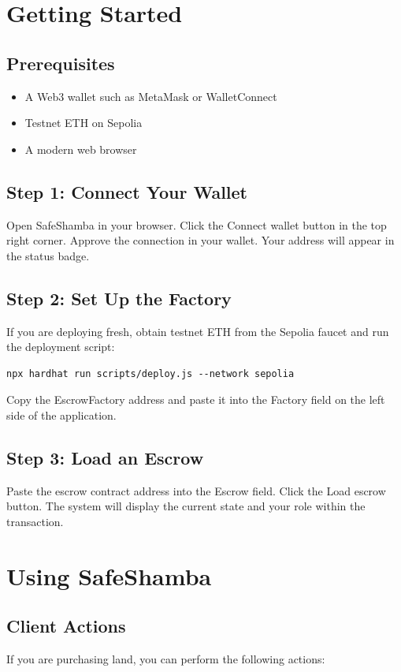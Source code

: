 \documentclass[11pt]{article}
\begin{document}
\section{Getting Started}
\subsection{Prerequisites}
\begin{itemize}
\item A Web3 wallet such as MetaMask or WalletConnect
\item Testnet ETH on Sepolia
\item A modern web browser
\end{itemize}

\subsection{Step 1: Connect Your Wallet}
Open SafeShamba in your browser. Click the Connect wallet button in the top right corner. Approve the connection in your wallet. Your address will appear in the status badge.

\subsection{Step 2: Set Up the Factory}
If you are deploying fresh, obtain testnet ETH from the Sepolia faucet and run the deployment script:
\begin{verbatim}
npx hardhat run scripts/deploy.js --network sepolia
\end{verbatim}
Copy the EscrowFactory address and paste it into the Factory field on the left side of the application.

\subsection{Step 3: Load an Escrow}
Paste the escrow contract address into the Escrow field. Click the Load escrow button. The system will display the current state and your role within the transaction.

\section{Using SafeShamba}
\subsection{Client Actions}
If you are purchasing land, you can perform the following actions:
\end{document}
